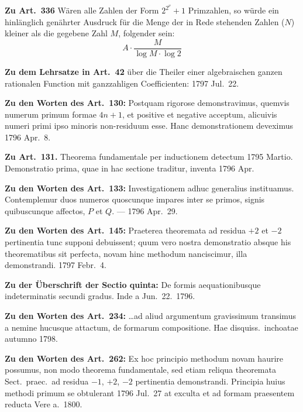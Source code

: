 \documentclass[12pt,a4paper]{article}
\theoremstyle{plain}
\theoremstyle{definition}
\theoremstyle{remark}
\begin{document}
\vspace{0.5em}
\textbf{Zu Art.\ 336} W\"aren alle Zahlen der Form $2^{2^\nu} + 1$ Primzahlen, so w\"urde ein hinl\"anglich gen\"ahrter Ausdruck f\"ur die Menge der in Rede stehenden Zahlen ($N$) kleiner als die gegebene Zahl $M$, folgender sein:
\[A \cdot \frac{M}{\log M \cdot \log 2}\]

\vspace{0.5em}
\textbf{Zu dem Lehrsatze in Art.\ 42} \"uber die Theiler einer algebraischen ganzen rationalen Function mit ganzzahligen Coefficienten: 1797 Jul.\ 22.

\vspace{0.5em}
\textbf{Zu den Worten des Art.\ 130:} Postquam rigorose demonstravimus, quemvis numerum primum formae $4n+1$, et positive et negative acceptum, alicuivis numeri primi ipso minoris non-residuum esse. Hanc demonstrationem deveximus 1796 Apr.\ 8.

\vspace{0.5em}
\textbf{Zu Art.\ 131.} Theorema fundamentale per inductionem detectum 1795 Martio. Demonstratio prima, quae in hac sectione traditur, inventa 1796 Apr.

\vspace{0.5em}
\textbf{Zu den Worten des Art.\ 133:} Investigationem adhuc generalius instituamus. Contemplemur duos numeros quoscunque impares inter se primos, signis quibuscunque affectos, $P$ et $Q$. --- 1796 Apr.\ 29.

\vspace{0.5em}
\textbf{Zu den Worten des Art.\ 145:} Praeterea theoremata ad residua $+2$ et $-2$ pertinentia tunc supponi debuissent; quum vero nostra demonstratio absque his theorematibus sit perfecta, novam hinc methodum nanciscimur, illa demonstrandi. 1797 Febr.\ 4.

\vspace{0.5em}
\textbf{Zu der Überschrift der Sectio quinta:} De formis aequationibusque indeterminatis secundi gradus. Inde a Jun.\ 22.\ 1796.

\vspace{0.5em}
\textbf{Zu den Worten des Art.\ 234:} \ldots ad aliud argumentum gravissimum transimus a nemine hucusque attactum, de formarum compositione. Hae disquiss.\ inchoatae autumno 1798.

\vspace{0.5em}
\textbf{Zu den Worten des Art.\ 262:} Ex hoc principio methodum novam haurire possumus, non modo theorema fundamentale, sed etiam reliqua theoremata Sect.\ praec.\ ad residua $-1$, $+2$, $-2$ pertinentia demonstrandi. Principia huius methodi primum se obtulerant 1796 Jul.\ 27 at exculta et ad formam praesentem reducta Vere a.\ 1800.
\end{document}

